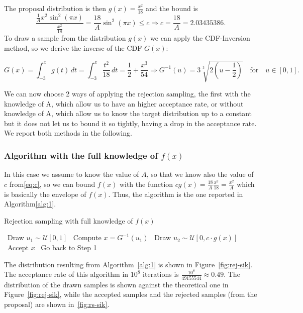 \documentclass[a4paper,12pt]{article}
\begin{document}
The proposal distribution is then $g(x) = \frac{x^2}{18}$ and the bound is
\begin{equation}
  \label{eq:c}
  \frac{\frac{1}{A}x^2\sin^2(\pi x)}{\frac{x^2}{18}} = \frac{18}{A}\sin^2(\pi x) \leq c \Rightarrow c = \frac{18}{A} = 2.03435386.
\end{equation}
To draw a sample from the distribution $g(x)$ we can apply the CDF-Inversion method, so we derive the inverse of the CDF $G(x)$:

\begin{equation*}
  G(x) = \int_{-3}^{x}g(t)\,dt = \int_{-3}^{x} \frac{t^2}{18}\,dt = \frac{1}{2}+\frac{x^3}{54}
  \Rightarrow G^{-1}(u) = 3\sqrt[3]{2(u-\frac{1}{2})} \quad \text{for}\quad u \in [0,1].
\end{equation*}

We can now choose 2 ways of applying the rejection sampling, the first with the knowledge of A, which allow us to have an higher acceptance rate, or without knowledge of A, which allow us to know the target distribution up to a constant but it does not let us to bound it so tightly, having a drop in the acceptance rate. We report both methods in the following.

\subsubsection*{Algorithm with the full knowledge of $f(x)$}
In this case we assume to know the value of $A$, so that we know also the value of $c$ from\ref{eq:c}, so we can bound $f(x)$ with the function $cg(x) = \frac{18}{A}\frac{x^2}{18} =\frac{x^2}{A}$ which is basically the envelope of $f(x)$.
Thus, the algorithm is the one reported in Algorithm\ref{alg:1}.

\begin{algorithm}
  \caption{Rejection sampling with full knowledge of $f(x)$}\label{alg:1}
  \begin{algorithmic}[1]
    \STATE~Draw $u_1 \sim \mathcal{U}[0,1]$
    \STATE~Compute $x = G^{-1}(u_1)$
    \STATE~Draw $u_2 \sim \mathcal{U}[0, c \cdot g(x)]$
    \STATE~Accept $x$
    \ELSE%
    \STATE~Go back to Step 1
    \ENDIF%
  \end{algorithmic}
\end{algorithm}

The distribution resulting from Algorithm~\ref{alg:1} is shown in Figure~\ref{fig:rej-sik}. The acceptance rate of this algorithm in $10^8$ iterations is $\frac{10^8}{49155544} \approx 0.49$. The distribution of the drawn samples is shown against the theoretical one in Figure~\ref{fig:rej-sik}, while the accepted samples and the rejected samples (from the proposal) are shown in~\ref{fig:rs-sik}.
\end{document}
